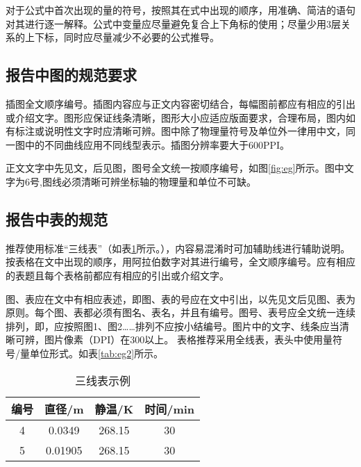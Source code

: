\documentclass{thuemp}
\begin{document}
对于公式中首次出现的量的符号，按照其在式中出现的顺序，用准确、简洁的语句对其进行逐一解释。公式中变量应尽量避免复合上下角标的使用；尽量少用3层关系的上下标，同时应尽量减少不必要的公式推导。

\subsection{报告中图的规范要求}
插图全文顺序编号。插图内容应与正文内容密切结合，每幅图前都应有相应的引出或介绍文字。图形应保证线条清晰，图形大小应适应版面要求，合理布局，图内如有标注或说明性文字时应清晰可辨。图中除了物理量符号及单位外一律用中文，同一图中的不同曲线应用不同线型表示。插图分辨率要大于600PPI。

正文文字中先见文，后见图，图号全文统一按顺序编号，如图\ref{fig:eg}所示。图中文字为6号,图线必须清晰可辨坐标轴的物理量和单位不可缺。




\subsection{报告中表的规范}
推荐使用标准“三线表”（如表\ref{tab:eg1}所示。），内容易混淆时可加辅助线进行辅助说明。按表格在文中出现的顺序，用阿拉伯数字对其进行编号，全文顺序编号。应有相应的表题且每个表格前都应有相应的引出或介绍文字。

图、表应在文中有相应表述，即图、表的号应在文中引出，以先见文后见图、表为原则。每个图、表都必须有图名、表名，并且有编号。图号、表号应全文统一连续排列，即，应按照图1、图2……排列不应按小结编号。图片中的文字、线条应当清晰可辨，图片像素（DPI）在300以上。
表格推荐采用全线表，表头中使用量符号/量单位形式。如表\ref{tab:eg2}所示。

\begin{table}[h]
\centering
\captionnamefont{\wuhao\bf\heiti}
\captiontitlefont{\wuhao\bf\heiti}
\caption{三线表示例} \label{tab:eg1}
\liuhao
\begin{tabular}{cccc}
\toprule
{编号} &  {直径}/\si{\metre} & {静温}/\si{\kelvin} & {时间}/min\\
\midrule 
4 & 0.0349 & 268.15 & 30\\
5 & 0.01905 & 268.15 & 30\\
\bottomrule
\end{tabular}
\end{table}
\end{document}
